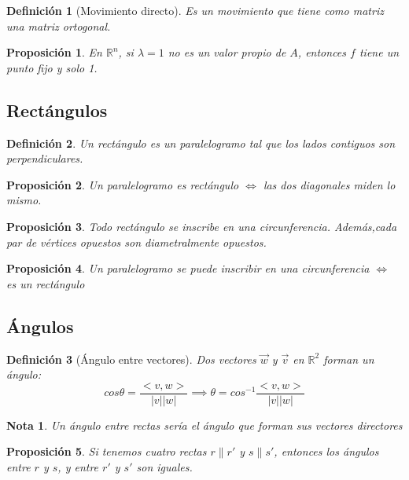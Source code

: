 \documentclass[11pt, a4paper, titlepage]{article}
\newcommand{\R}{\mathbb{R}}
\theoremstyle{theorem-style}
\newtheorem*{nprop}{Proposición}
\theoremstyle{definition-style}
\newtheorem*{ndef}{Definición}
\theoremstyle{remark-style}
\newtheorem*{nota}{Nota}
\theoremstyle{example-style}
\begin{document}
\begin{ndef}[Movimiento directo]
	Es un movimiento que tiene como matriz una matriz ortogonal. 
\end{ndef}
\begin{nprop}
	En $\R^n$, si $\lambda = 1$ no es un valor propio de $A$, entonces $f$ tiene un punto fijo y solo 1.
\end{nprop}




\subsection{Rectángulos}
\begin{ndef}
	Un rectángulo es un paralelogramo tal que los lados contiguos son perpendiculares.
\end{ndef}

\begin{nprop}
	Un paralelogramo es rectángulo $\iff$ las dos diagonales miden lo mismo.
\end{nprop}

\begin{nprop}
	Todo rectángulo se inscribe en una circunferencia. Además,cada par de vértices opuestos son diametralmente opuestos.
\end{nprop}

\begin{nprop}
	Un paralelogramo se puede inscribir en una circunferencia $\iff$ es un rectángulo
\end{nprop}

\subsection{Ángulos}

\begin{ndef}[Ángulo entre vectores]
	Dos vectores $\vec{w}$ y $\vec{v}$ en $\R^2$ forman un ángulo:
	\[
	cos \theta =  \frac{< v,w >}{|v||w|} \implies \theta = cos^{-1} \frac{< v,w >}{|v||w|}
	\]
\end{ndef}
\begin{nota}
	Un ángulo entre rectas sería el ángulo que forman sus vectores directores
\end{nota}
\begin{nprop}
	Si tenemos cuatro rectas $r \parallel r'$ y $s \parallel s'$, entonces los ángulos entre $r$ y $s$, y entre $r'$ y $s'$ son iguales.
\end{nprop}
\end{document}
